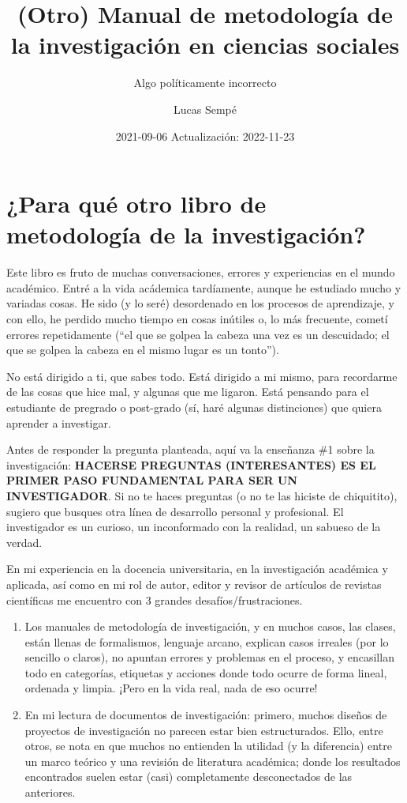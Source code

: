 \documentclass[
]{book}
\title{(Otro) Manual de metodología de la investigación en ciencias sociales}
\subtitle{Algo políticamente incorrecto}
\author{Lucas Sempé}
\date{2021-09-06 Actualización: 2022-11-23}
\begin{document}
\maketitle

{
\setcounter{tocdepth}{1}
\tableofcontents
}
\hypertarget{para-quuxe9-otro-libro-de-metodologuxeda-de-la-investigaciuxf3n}{%
\chapter{¿Para qué otro libro de metodología de la investigación?}\label{para-quuxe9-otro-libro-de-metodologuxeda-de-la-investigaciuxf3n}}

Este libro es fruto de muchas conversaciones, errores y experiencias en el mundo académico. Entré a la vida acádemica tardíamente, aunque he estudiado mucho y variadas cosas. He sido (y lo seré) desordenado en los procesos de aprendizaje, y con ello, he perdido mucho tiempo en cosas inútiles o, lo más frecuente, cometí errores repetidamente (``el que se golpea la cabeza una vez es un descuidado; el que se golpea la cabeza en el mismo lugar es un tonto'').

No está dirigido a ti, que sabes todo. Está dirigido a mi mismo, para recordarme de las cosas que hice mal, y algunas que me ligaron. Está pensando para el estudiante de pregrado o post-grado (sí, haré algunas distinciones) que quiera aprender a investigar.

Antes de responder la pregunta planteada, aquí va la enseñanza \#1 sobre la investigación: \textbf{HACERSE PREGUNTAS (INTERESANTES) ES EL PRIMER PASO FUNDAMENTAL PARA SER UN INVESTIGADOR}. Si no te haces preguntas (o no te las hiciste de chiquitito), sugiero que busques otra línea de desarrollo personal y profesional. El investigador es un curioso, un inconformado con la realidad, un sabueso de la verdad.

En mi experiencia en la docencia universitaria, en la investigación académica y aplicada, así como en mi rol de autor, editor y revisor de artículos de revistas científicas me encuentro con 3 grandes desafíos/frustraciones.

\begin{enumerate}
\def\labelenumi{\arabic{enumi})}
\item
  Los manuales de metodología de investigación, y en muchos casos, las clases, están llenas de formalismos, lenguaje arcano, explican casos irreales (por lo sencillo o claros), no apuntan errores y problemas en el proceso, y encasillan todo en categorías, etiquetas y acciones donde todo ocurre de forma lineal, ordenada y limpia. ¡Pero en la vida real, nada de eso ocurre!
\item
  En mi lectura de documentos de investigación: primero, muchos diseños de proyectos de investigación no parecen estar bien estructurados. Ello, entre otros, se nota en que muchos no entienden la utilidad (y la diferencia) entre un marco teórico y una revisión de literatura académica; donde los resultados encontrados suelen estar (casi) completamente desconectados de las anteriores.
\end{enumerate}
\end{document}
